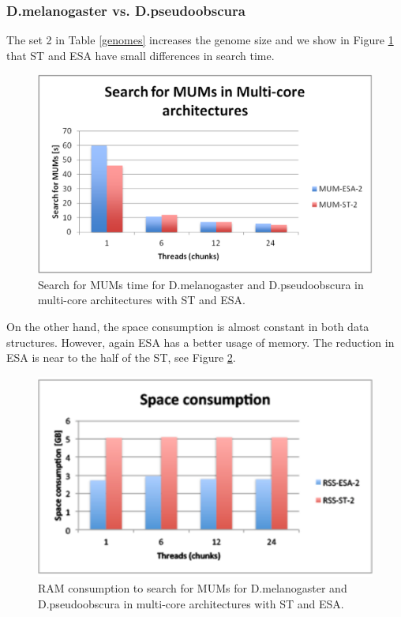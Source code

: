 \documentclass{acm_proc_article-sp}
\begin{document}
\subsubsection{D.melanogaster vs. D.pseudoobscura}
The set 2 in Table \ref{genomes} increases the genome size and we show in Figure \ref{fig:fly-mum} that ST and ESA have small differences in search time.
\begin{figure}[h]
  \centering
  \includegraphics[scale=0.3]{fly-MUM.eps}
  \caption{Search for MUMs time for D.melanogaster and D.pseudoobscura in multi-core architectures with ST and ESA.}
  \label{fig:fly-mum}
\end{figure}  
On the other hand, the space consumption is almost constant in both data structures. However, again ESA has a better usage of memory. The reduction in ESA is near to the half of the ST, see Figure \ref{fig:fly-ram}.
\begin{figure}[h]
  \centering
  \includegraphics[scale=0.65]{fly-RAM.eps}
  \caption{RAM consumption to search for MUMs for D.melanogaster and D.pseudoobscura in multi-core architectures with ST and ESA.}
  \label{fig:fly-ram}
\end{figure}  
\end{document}
